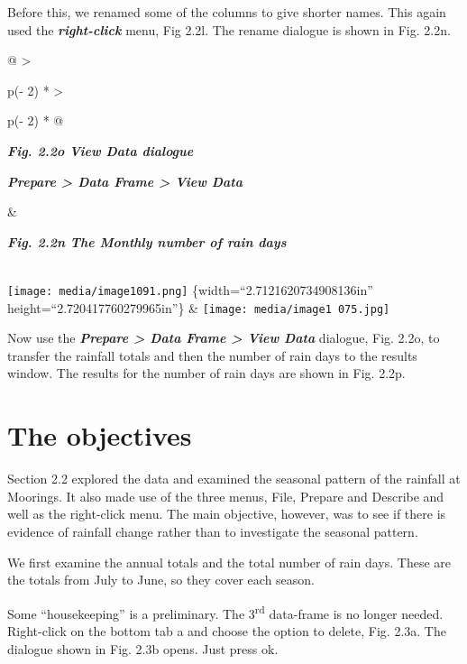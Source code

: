 \documentclass[
  letterpaper,
  DIV=11,
  numbers=noendperiod]{scrreprt}
\begin{document}
Before this, we renamed some of the columns to give shorter names. This
again used the \textbf{\emph{right-click}} menu, Fig 2.2l. The rename
dialogue is shown in Fig. 2.2n.

\begin{longtable}[]{@{}
  >{\raggedright\arraybackslash}p{(\columnwidth - 2\tabcolsep) * }
  >{\raggedright\arraybackslash}p{(\columnwidth - 2\tabcolsep) * }@{}}
\toprule\noalign{}
\begin{minipage}[b]{\linewidth}\raggedright
\textbf{\emph{Fig. 2.2o View Data dialogue}}

\textbf{\emph{Prepare \textgreater{} Data Frame \textgreater{} View
Data}}
\end{minipage} & \begin{minipage}[b]{\linewidth}\raggedright
\textbf{\emph{Fig. 2.2n The Monthly number of rain days}}
\end{minipage} \\
\midrule\noalign{}
\endhead
\bottomrule\noalign{}
\endlastfoot
\texttt{[image: media/image1091.png]} \{width=``2.7121620734908136in''
height=``2.720417760279965in''\} &
\texttt{[image: media/image1 075.jpg]} \\
\end{longtable}

Now use the \textbf{\emph{Prepare \textgreater{} Data Frame
\textgreater{} View Data}} dialogue, Fig. 2.2o, to transfer the rainfall
totals and then the number of rain days to the results window. The
results for the number of rain days are shown in Fig. 2.2p.

\section{The objectives}\label{the-objectives}

Section 2.2 explored the data and examined the seasonal pattern of the
rainfall at Moorings. It also made use of the three menus, File, Prepare
and Describe and well as the right-click menu. The main objective,
however, was to see if there is evidence of rainfall change rather than
to investigate the seasonal pattern.

We first examine the annual totals and the total number of rain days.
These are the totals from July to June, so they cover each season.

Some ``housekeeping'' is a preliminary. The 3\textsuperscript{rd}
data-frame is no longer needed. Right-click on the bottom tab a and
choose the option to delete, Fig. 2.3a. The dialogue shown in Fig. 2.3b
opens. Just press ok.
\end{document}
